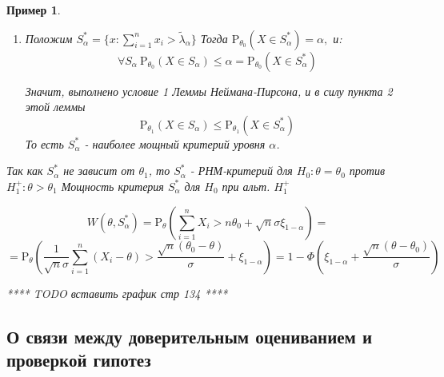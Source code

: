 \documentclass[12pt]{article}
\newtheorem*{example}{Пример}
\theoremstyle{basic_theorem}
\theoremstyle{name_theorem}
\def\P{
    \mathrm{P}
}
\begin{document}
\begin{example}
\begin{enumerate}
        \item Положим $S^*_{\alpha} = \{x: \sum_{i=1}^n x_i > \widetilde{\lambda}_\alpha\}$
            Тогда $\P_{\theta_0}(X\in S_\alpha^*)=\alpha,$ и: 
            $$\forall S_\alpha\ \P_{\theta_0}(X\in S_\alpha)\leq\alpha = \P_{\theta_0}(X\in S_\alpha^*)$$
        
            Значит, выполнено условие 1 Леммы Неймана-Пирсона, и в силу
            пункта 2 этой леммы
            $$\P_{\theta_1}(X\in S_\alpha) \leq \P_{\theta_1}(X\in S_\alpha^*)$$
            То есть $S_\alpha^*$ - наиболее мощный критерий уровня $\alpha$.
        \end{enumerate} 
        Так как $S^*_{\alpha}$ не зависит от $\theta_1$,
        то $S^*_{\alpha}$ - РНМ-критерий для $H_0: \theta = \theta_0$
        против $H^+_1 : \theta > \theta_1$
        Мощность критерия $S^*_{\alpha}$ для $H_0$ при альт. $H^+_1$

        $$W(\theta, S^*_{\alpha}) = \P_\theta\left(\sum_{i=1}^nX_i > n\theta_0 + \sqrt{n}\sigma\xi_{1-\alpha}\right) = $$
        $$ = \P_\theta\left(\frac{1}{\sqrt{n}\sigma} \sum_{i=1}^n(X_i - \theta) > \frac{\sqrt{n}(\theta_0 - \theta)}{\sigma} + \xi_{1-\alpha}\right) =
        1 - \Phi\left(\xi_{1-\alpha} + \frac{\sqrt{n}(\theta - \theta_0)}{\sigma}\right)$$

        **** TODO вставить график стр 134 ****

\end{example}

    \subsection*{О связи между доверительным оцениванием и проверкой гипотез}
\end{document}
